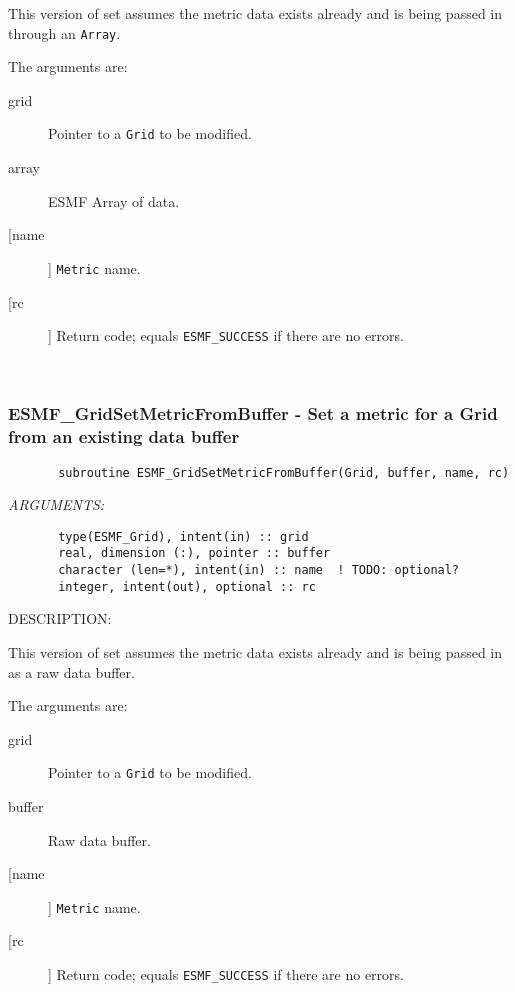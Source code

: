 {       This version of set assumes the metric data exists already and is being
       passed in through an {\tt Array}.
  
       The arguments are:
       \begin{description}
       \item[grid] 
            Pointer to a {\tt Grid} to be modified.
       \item[array]
            ESMF Array of data.
       \item [[name]]
             {\tt Metric} name.
       \item[[rc]] 
            Return code; equals {\tt ESMF\_SUCCESS} if there are no errors.
       \end{description}
   
 
\mbox{}\hrulefill\ 
 
\subsubsection{ESMF\_GridSetMetricFromBuffer - Set a metric for a Grid from an existing data buffer}


 
\begin{verbatim}       subroutine ESMF_GridSetMetricFromBuffer(Grid, buffer, name, rc)\end{verbatim}{\em ARGUMENTS:}
\begin{verbatim}       type(ESMF_Grid), intent(in) :: grid
       real, dimension (:), pointer :: buffer
       character (len=*), intent(in) :: name  ! TODO: optional?
       integer, intent(out), optional :: rc            \end{verbatim}
{\sf DESCRIPTION:\\ }


       This version of set assumes the metric data exists already and is being
       passed in as a raw data buffer.
  
       The arguments are:
       \begin{description}
       \item[grid] 
            Pointer to a {\tt Grid} to be modified.
       \item[buffer]
            Raw data buffer.         
       \item [[name]]
             {\tt Metric} name.
       \item[[rc]] 
            Return code; equals {\tt ESMF\_SUCCESS} if there are no errors.
       \end{description}
   
}
